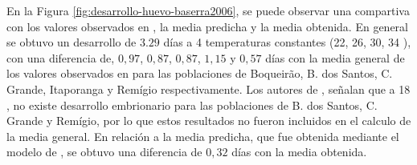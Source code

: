 En la Figura \ref{fig:desarrollo-huevo-baserra2006}, se puede observar una compartiva con los
valores observados en \cite{BESERRA2006}, la media predicha y la media obtenida. En general se
obtuvo un desarrollo de $3.29$ días a 4 temperaturas constantes (22, 26, 30, 34 \textcelsius), con
una diferencia de, $0,97$, $0,87$, $0,87$, $1,15$ y $0,57$ días con la media general de los
valores observados en \cite{BESERRA2006} para las poblaciones de Boqueirão, B. dos Santos, C.
Grande, Itaporanga y Remígio respectivamente. Los autores de \cite{BESERRA2006}, señalan que a
18 \textcelsius, no existe desarrollo embrionario para las poblaciones de B. dos Santos, C. Grande
y Remígio, por lo que estos resultados no fueron incluidos en el calculo de la media general. En
relación a la media predicha, que fue obtenida mediante el modelo de \cite{sharpe1977reaction}, se
obtuvo una diferencia de $0,32$ días con la media obtenida.

